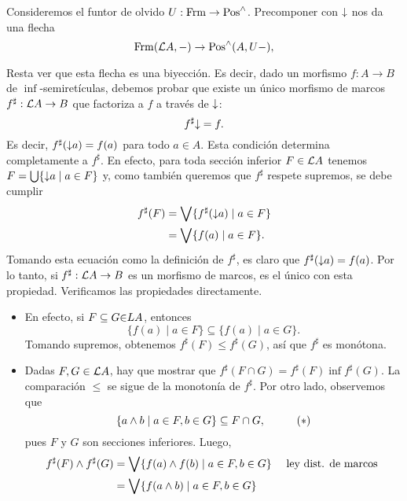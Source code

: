 \begin{sol}
    Consideremos el funtor de olvido $U:\Frm\to\Pos^{\inf}$.
    Precomponer con $\down$ nos da una flecha
    \[
        \Frm(\cal LA,-)\to \Pos^{\inf}(A,U-)
    ,\]
    
    Resta ver que esta flecha es una biyección.
    Es decir, dado un morfismo $f:A\to B$
    de $\inf$-semiretículas,
    debemos probar que existe un único morfismo de marcos
    $f^\sharp:\cal LA\to B$ que factoriza a $f$ a través
    de $\down$:
    \[
        f^\sharp\down = f
    .\]
    Es decir, $f^\sharp(\down a)=f(a)$ para todo $a\in A$.
    Esta condición determina completamente a $f^\sharp$.
    En efecto, para toda sección inferior $F\in\cal LA$ tenemos
    $F=\bigcup\{\down a \mid a\in F\}$ y, como también queremos
    que $f^\sharp$ respete supremos, se debe cumplir
    \begin{align*}
        f^\sharp(F)
        &= \Sup\{f^\sharp(\down a) \mid a\in F\} \\
        &= \Sup\{f(a) \mid a\in F\}.
    \end{align*}
    Tomando esta ecuación como la definición de $f^\sharp$, es
    claro que $f^\sharp(\down a)=f(a)$.
    Por lo tanto, si $f^\sharp:\cal LA\to B$ es un
    morfismo de marcos, es el único con esta propiedad.
    Verificamos las propiedades directamente.
    \begin{itemize}
        \item En efecto, si $F\subseteq G\cal\in LA$, entonces 
        \[
            \{f(a) \mid a\in F\} \subseteq \{f(a) \mid a\in G\}
        .\]
        Tomando supremos, obtenemos
        $f^\sharp(F)\leq f^\sharp(G)$, así que $f^\sharp$ es
        monótona.
        \item
        Dadas $F,G\in\cal LA$, hay que mostrar
        que $f^\sharp(F\cap G)=f^\sharp(F)\inf f^\sharp(G)$.
        La comparación $\leq$ se sigue de la monotonía de
        $f^\sharp$.
        Por otro lado, observemos que
        \[
            \{ a\inf b \mid a\in F, b\in G\}
            \subseteq F\cap G,
            \hspace{10mm} (*)
        \]
        pues $F$ y $G$ son secciones inferiores.
        Luego,
        \begin{align*}
            f^\sharp(F)\inf f^\sharp(G)
            &= \Sup\{f(a)\inf f(b) \mid a\in F, b\in G\}
                && \text{ ley dist. de marcos } \\
            &= \Sup\{f(a\inf b) \mid a\in F, b\in G\} \\

\end{align*}
\end{itemize}
\end{sol}

